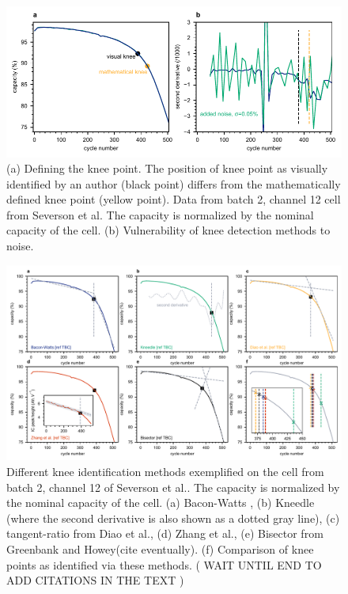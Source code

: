 \documentclass[journal=jpcl, manuscript=article, layout=onecolumn]{achemso}
\begin{document}
\begin{figure}[ht]
\centering
\includegraphics[width=1\textwidth]{images/knee_definition.pdf}
\caption{(a) Defining the knee point. The position of knee point as visually identified by an author (black point) differs from the mathematically defined knee point (yellow point). Data from batch 2, channel 12 cell from Severson et al.\cite{severson_data-driven_2019} The capacity is normalized by the nominal capacity of the cell. (b) Vulnerability of knee detection methods to noise.}
\label{fig:knee_definition3}
\end{figure}



\begin{figure}[h!tb]
\centering
\includegraphics[width=\textwidth]{images/knee_identification_methods.pdf}
\caption{Different knee identification methods exemplified on the cell from batch 2, channel 12 of Severson et al.\cite{severson_data-driven_2019}. The capacity is normalized by the nominal capacity of the cell. (a) Bacon-Watts \cite{fermin-cueto_identification_2020}, (b) Kneedle \cite{satopaa_finding_2011} (where the second derivative is also shown as a dotted gray line), (c) tangent-ratio from Diao et al.\cite{diao_algorithm_2019}, (d) Zhang et al.\cite{zhang_identifying_2020}, (e) Bisector from Greenbank and Howey(cite eventually). (f) Comparison of knee points as identified via these methods. 
(
WAIT UNTIL END TO ADD CITATIONS IN THE TEXT )}
\label{fig:knee_identification_methods}
\end{figure}
\end{document}

